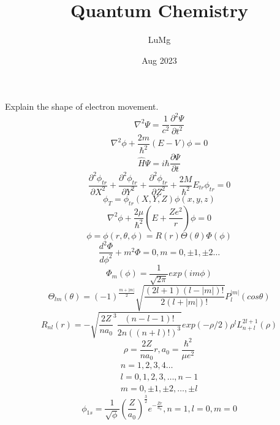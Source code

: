 \documentclass{article}
\title{Quantum Chemistry}
\author{LuMg}
\date{Aug 2023}
\begin{document}
\maketitle
Explain the shape of electron movement.\\
\begin{equation}
      \nabla ^2\Psi = \frac{1}{c^2}\frac{\partial^2 \Psi}{\partial t^2}
\end{equation}
\begin{equation}
\nabla^2\phi +\frac{2m}{\hbar^2}(E-V)\phi = 0
\end{equation}
\begin{equation}
\hat{H}\Psi = i\hbar\frac{\partial\Psi}{\partial t}
\end{equation}
\begin{equation}
    \frac{\partial^2\phi_{tr}}{\partial X^2}+\frac{\partial^2\phi_{tr}}{\partial Y^2}+\frac{\partial^2\phi_{tr}}{\partial Z^2}+\frac{2M}{\hbar^2}E_{tr}\phi_{tr} = 0
\end{equation}
\begin{equation}
    \phi_T = \phi_{tr}(X,Y,Z)\phi(x,y,z)
\end{equation}
\begin{equation}
    \nabla^2\phi + \frac{2\mu}{\hbar^2}(E+\frac{Ze^2}{r})\phi = 0
\end{equation}
\begin{equation}
    \phi = \phi(r,\theta,\phi) = R(r)\Theta(\theta)\Phi(\phi)
\end{equation}
\begin{equation}
    \frac{d^2\Phi}{d\phi^2}+m^2\Phi = 0, m = 0,\pm1,\pm2\dots
\end{equation}
\begin{equation}
    \Phi_m(\phi) = \frac{1}{\sqrt{2\pi}}exp(im\phi)
\end{equation}
\begin{equation}
    \Theta_{lm}(\theta) = (-1)^{\frac{m+|m|}{2}}\sqrt{\frac{(2l+1)(l-|m|)!}{2(l+|m|)!}}P_l^|m|(cos\theta)
\end{equation}
\begin{equation}
    R_{nl}(r) = -\sqrt{\frac{2Z}{na_0}^3\frac{(n-l-1)!}{2n((n+l)!)^3}}exp(-\rho/2)\rho^lL^{2l+1}_{n+l}(\rho)
\end{equation}
\begin{equation}
    \rho = \frac{2Z}{na_0}r, a_0 = \frac{\hbar^2}{\mu e^2}
\end{equation}
\begin{equation}
\begin{array}{l}
n = 1,2,3,4\dots \\
     l = 0,1,2,3,\dots,n - 1 \\
     m = 0, \pm1,\pm2,\dots,\pm l
\end{array}
\end{equation}
\begin{equation}
    \phi_{1s} = \frac{1}{\sqrt{\phi}}(\frac{Z}{a_0})^{\frac{3}{2}}e^{-\frac{Zr}{a_0}}, n=1,l = 0,m=0
\end{equation}
\end{document}
